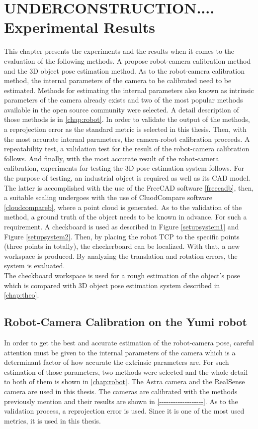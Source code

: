 
\chapter{UNDERCONSTRUCTION....   Experimental Results}
\label{chap:exp}

This chapter presents the experiments and the results when it comes to the evaluation of the following methods. A propose robot-camera calibration method and the 3D object pose estimation method. As to the robot-camera calibration method, the internal parameters of the camera to be calibrated need to be estimated. Methods for estimating the internal parameters also known as intrinsic parameters of the camera already exists and two of the most popular methods available in the open source community were selected. A detail description of those methods is in \ref{chap:robot}. In order to validate the output of the methods, a reprojection error as the standard metric is selected in this thesis. Then, with the most accurate internal parameters, the camera-robot calibration proceeds. A repeatability test, a validation test for the result of the robot-camera calibration follows. And finally, with the most accurate result of the robot-camera calibration, experiments for testing the 3D pose estimation system follows. For the purpose of testing, an industrial object is required as well as its CAD model. The latter is accomplished with the use of the FreeCAD software \ref{freecadb}, then, a suitable scaling undergoes with the use of CluodCompare software \ref{cloudcompareb}, where a point cloud is generated. As to the validation of the method, a ground truth of the object needs to be known in advance. For such a requirement. A checkboard is used as described in Figure \ref{setupsystem1} and Figure \ref{setupsystem2}. Then, by placing the robot TCP to the specific points (three points in totally), the checkerboard can be localized. With that, a new workspace is produced. By analyzing the translation and rotation errors, the system is evaluated.\\
The checkboard workspace is used for a rough estimation of the object's pose which is compared with 3D object pose estimation system described in \ref{chap:theo}.  


\section{Robot-Camera Calibration on the Yumi robot}
In order to get the best and accurate estimation of the robot-camera pose, careful attention must be given to the internal parameters of the camera which is a determinant factor of how accurate the extrinsic parameters are. For such estimation of those parameters, two methods were selected and the whole detail to both of them is shown in \ref{chap:robot}. The Astra camera and the RealSense camera are used in this thesis.  The cameras are calibrated with the methods previously mention and their results are shown in \ref{-------------------}. As to the validation process, a reprojection error is used. Since it is one of the most used metrics,  it is used in this thesis. 

